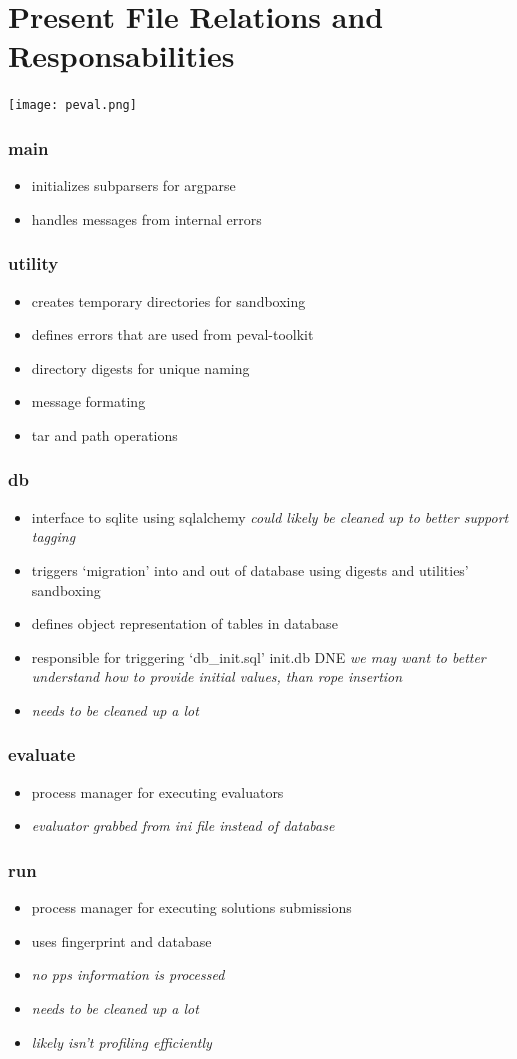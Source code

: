 \documentclass[11pt]{article} %
\def\ptk{peval-toolkit\xspace}
\newenvironment{mitemize}[1]{
  \begin{minipage}{\columnwidth}
  \subsubsection*{#1}
  \begin{itemize}
    \setlength{\topsep}{0pt}
    \setlength{\itemsep}{1pt}
    \setlength{\parsep}{0pt}
    \setlength{\parskip}{0pt}
}{\end{itemize}\end{minipage}}
\begin{document}
\section*{Present File Relations and Responsabilities}
\begin{multicols}{2}
{\centering \texttt{[image: peval.png]}}

\begin{mitemize}{main}
\item initializes subparsers for argparse
\item handles messages from internal errors
\end{mitemize}

\begin{mitemize}{utility}
\item creates temporary directories for sandboxing
\item defines errors that are used from \ptk
\item directory digests for unique naming
\item message formating
\item tar and path operations
\end{mitemize}

\begin{mitemize}{db}
\item interface to sqlite using sqlalchemy {\em could likely be cleaned up to better support tagging}
\item triggers `migration' into and out of database using digests and utilities' sandboxing
\item defines object representation of tables in database
\item responsible for triggering `db\_init.sql' init.db DNE {\em we may want to better understand how to provide initial values, than rope insertion} 
\item {\em needs to be cleaned up a lot}%
\end{mitemize}

\begin{mitemize}{evaluate}
\item process manager for executing evaluators
\item {\em evaluator grabbed from ini file instead of database}
\end{mitemize}

\begin{mitemize}{run}
\item process manager for executing solutions submissions
\item uses fingerprint and database
\item {\em no pps information is processed}
\item {\em needs to be cleaned up a lot}
\item {\em likely isn't profiling efficiently}
\end{mitemize}


\end{multicols}
\end{document}
